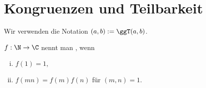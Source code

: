 \section{Kongruenzen und Teilbarkeit}

\begin{conv*}
	Wir verwenden die Notation $(a,b) := \ggT(a,b)$.
\end{conv*}

\begin{df*}
	$f: \N \to \C$ nennt man , wenn
	\begin{enumerate}[i)]
		\item
			$f(1) = 1$,
		\item
			$f(m n) = f(m) f(n)$ für $(m,n) = 1$.
	\end{enumerate}
\end{df*}

